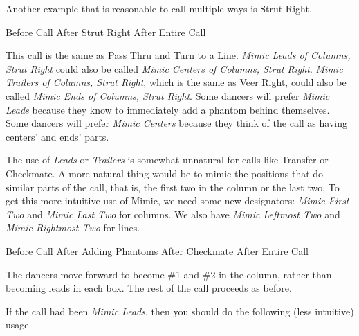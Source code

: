 \documentclass[12pt]{article}
\begin{document}
Another example that is reasonable to call multiple ways is Strut Right.

{Before Call}
{\cr
 \cr
 \cr
 }
{}
{
 }
 {After Strut Right}
{}
{After Entire Call}
\endexample

This call is the same as Pass Thru and Turn to a Line.
\emph{Mimic Leads of Columns, Strut Right} could also be called
\emph{Mimic Centers of Columns, Strut Right}.
\emph{Mimic Trailers of Columns, Strut Right}, which is the same as Veer Right,
could also be called \emph{Mimic Ends of Columns, Strut Right}.
Some dancers will prefer \emph{Mimic Leads} because they know to immediately
add a phantom behind themselves.
Some dancers will prefer \emph{Mimic Centers} because they think of the call
as having centers' and ends' parts.

The use of \emph{Leads} or \emph{Trailers} is somewhat unnatural for
calls like Transfer or Checkmate.  A more natural thing would be to
mimic the positions that do similar parts of the call, that is, the
first two in the column or the last two.  To get this more intuitive
use of Mimic, we need some new designators: \emph{Mimic First Two}
and \emph{Mimic Last Two} for columns.
We also have \emph{Mimic Leftmost Two}
and \emph{Mimic Rightmost Two} for lines.

\displayfour
{\cr
 }
{Before Call}
{\cr
 \cr
 \cr
 }
{After Adding Phantoms}
{\cr
 \cr
 \cr
 }
 {After Checkmate}
{\cr
 }
{After Entire Call}
\endexample

The dancers move forward to become \#1 and \#2 in the column,
rather than becoming leads in each box.
The rest of the call proceeds as before.

If the call had been \emph{Mimic Leads}, then you should do the
following (less intuitive) usage.
\end{document}

